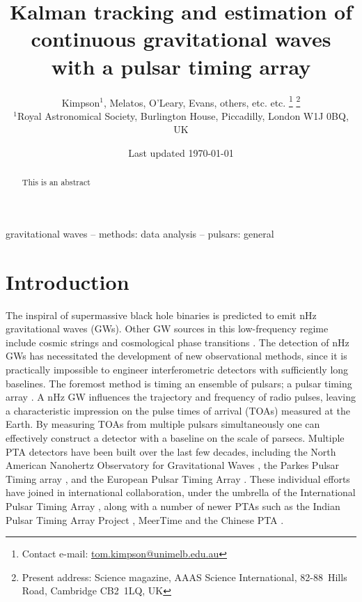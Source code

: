 \documentclass[fleqn,usenatbib,useAMS]{mnras}
\title[Kalman PTA]{Kalman tracking and estimation of continuous gravitational waves with a pulsar timing array}
\author[Kimpson]{Kimpson$^{1}$, Melatos, O'Leary, Evans, others, etc. etc. %
\thanks{Contact e-mail: \href{tom.kimpson@unimelb.edu.au}{tom.kimpson@unimelb.edu.au}}%
\thanks{Present address: Science magazine, AAAS Science International, \mbox{82-88}~Hills Road, Cambridge CB2~1LQ, UK}%
\\
$^{1}$Royal Astronomical Society, Burlington House, Piccadilly, London W1J 0BQ, UK}
\date{Last updated \today}
\begin{document}
\label{firstpage}
\pagerange{\pageref{firstpage}--\pageref{lastpage}}
\maketitle

\begin{abstract}
This is an abstract
\end{abstract}

\begin{keywords}
gravitational waves -- methods: data analysis -- pulsars: general
\end{keywords}



\begingroup
\let\clearpage\relax
\endgroup
\newpage
\section{Introduction}\label{sec:intro}
The inspiral of supermassive black hole binaries \citep[SMBHBs;][]{Rajagopal1995,Jaffe_2003, Wyithe2003,Sesana2013,McWilliams_2014,Ravi2015MNRAS.447.2772R,Burke2019, Skyes2022} is predicted to emit nHz gravitational waves (GWs). Other GW sources in this low-frequency regime include cosmic strings \citep[e.g.][]{PTAstring} and cosmological phase transitions \citep[e.g.][]{PTAphase}. The detection of nHz GWs has necessitated the development of new observational methods, since it is practically impossible to engineer interferometric detectors with sufficiently long baselines. The foremost method is timing an ensemble of pulsars; a pulsar timing array \citep[PTA;][]{ Tiburzi2018, 2021hgwa.bookE...4V}. A nHz GW influences the trajectory and frequency of radio pulses, leaving a characteristic impression on the pulse times of arrival (TOAs) measured at the  Earth. By measuring TOAs from multiple pulsars simultaneously one can effectively construct a detector with a baseline on the scale of parsecs. Multiple PTA detectors have been built over the last few decades, including the North American Nanohertz Observatory for Gravitational Waves \citep[NANOGrav,][]{NANOgrav2023}, the Parkes Pulsar Timing array \citep[PPTA,][]{Parkes2023}, and the European Pulsar Timing Array \citep[EPTA,][]{EPTA2023}. These individual efforts have joined in international collaboration, under the umbrella of the International Pulsar Timing Array \citep[IPTA,][]{2019MNRAS.490.4666P}, along with a number of newer PTAs such as the Indian Pulsar Timing Array Project \citep[InPTA,][]{ipta}, MeerTime \citep{meertime2,Meertime} and the Chinese PTA \citep[CPTA,][]{Hobbs_2019}. \newline 
\end{document}
